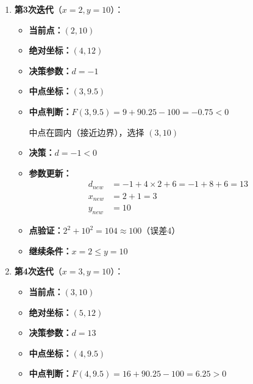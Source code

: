 ﻿\documentclass[12pt,a4paper]{article}
\begin{document}
\begin{enumerate}
\begin{itemize}
    中点在圆内，选择 $(2, 10)$
  \item \textbf{决策：}$d = -11 < 0$
  \item \textbf{参数更新：}
    \begin{align*}
    d_{new} &= -11 + 4 \times 1 + 6 = -11 + 4 + 6 = -1 \\
    x_{new} &= 1 + 1 = 2 \\
    y_{new} &= 10
    \end{align*}
  \item \textbf{点验证：}$1^2 + 10^2 = 101 \approx 100$（误差1，接近圆）
  \item \textbf{继续条件：}$x = 1 \leq y = 10$ \checkmark
  \end{itemize}

\item \textbf{第3次迭代}（$x=2, y=10$）：
  \begin{itemize}
  \item \textbf{当前点：}$(2, 10)$
  \item \textbf{绝对坐标：}$(4, 12)$
  \item \textbf{决策参数：}$d = -1$
  \item \textbf{中点坐标：}$(3, 9.5)$
  \item \textbf{中点判断：}$F(3, 9.5) = 9 + 90.25 - 100 = -0.75 < 0$
    
    中点在圆内（接近边界），选择 $(3, 10)$
  \item \textbf{决策：}$d = -1 < 0$
  \item \textbf{参数更新：}
    \begin{align*}
    d_{new} &= -1 + 4 \times 2 + 6 = -1 + 8 + 6 = 13 \\
    x_{new} &= 2 + 1 = 3 \\
    y_{new} &= 10
    \end{align*}
  \item \textbf{点验证：}$2^2 + 10^2 = 104 \approx 100$（误差4）
  \item \textbf{继续条件：}$x = 2 \leq y = 10$ \checkmark
  \end{itemize}

\item \textbf{第4次迭代}（$x=3, y=10$）：
  \begin{itemize}
  \item \textbf{当前点：}$(3, 10)$
  \item \textbf{绝对坐标：}$(5, 12)$
  \item \textbf{决策参数：}$d = 13$
  \item \textbf{中点坐标：}$(4, 9.5)$
  \item \textbf{中点判断：}$F(4, 9.5) = 16 + 90.25 - 100 = 6.25 > 0$
    

\end{itemize}
\end{enumerate}
\end{document}
